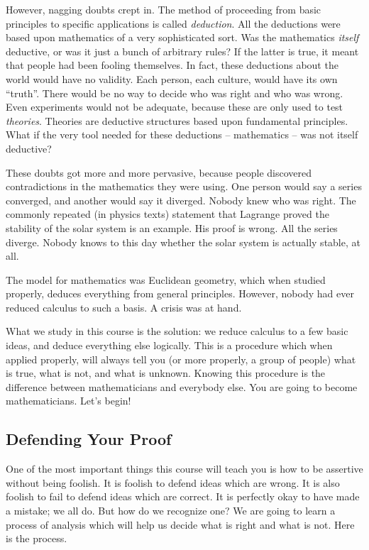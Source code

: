 \documentclass{article}
\begin{document}
However, nagging doubts crept in. The method of proceeding from basic principles to specific applications is called \emph{deduction}. All the deductions were based upon mathematics of a very sophisticated sort. Was the mathematics \emph{itself} deductive, or was it just a bunch of arbitrary rules? If the latter is true, it meant that people had been fooling themselves. In fact, these deductions about the world would have no validity. Each person, each culture, would have its own ``truth''. There would be no way to decide who was right and who was wrong. Even experiments would not be adequate, because these are only used to test \emph{theories}. Theories are deductive structures based upon fundamental principles. What if the very tool needed for these deductions -- mathematics -- was not itself deductive?

These doubts got more and more pervasive, because people discovered contradictions in the mathematics they were using. One person would say a series converged, and another would say it diverged. Nobody knew who was right. The commonly repeated (in physics texts) statement that Lagrange proved the stability of the solar system is an example. His proof is wrong. All the series diverge. Nobody knows to this day whether the solar system is actually stable, at all.

The model for mathematics was Euclidean geometry, which when studied properly, deduces everything from general principles. However, nobody had ever reduced calculus to such a basis. A crisis was at hand.

What we study in this course is the solution: we reduce calculus to a few basic ideas, and deduce everything else logically. This is a procedure which when applied properly, will always tell you (or more properly, a group of people) what is true, what is not, and what is unknown. Knowing this procedure is the difference between mathematicians and everybody else. You are going to become mathematicians. Let's begin!


\subsection{Defending Your Proof}

One of the most important things this course will teach you is how to be assertive without being foolish. It is foolish to defend ideas which are wrong. It is also foolish to fail to defend ideas which are correct. It is perfectly okay to have made a mistake; we all do. But how do we recognize one? We are going to learn a process of analysis which will help us decide what is right and what is not. Here is the process.
\end{document}

